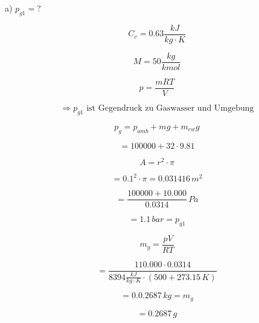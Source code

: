 a) $p_{g1} = ?$

\[
C_v = 0.63 \frac{kJ}{kg \cdot K}
\]

\[
M = 50 \frac{kg}{kmol}
\]

\[
p = \frac{mRT}{V}
\]

\[
\Rightarrow p_{g1} \text{ ist Gegendruck zu Gaswasser und Umgebung}
\]

\[
p_g = p_{amb} + mg + m_{ew} g
\]

\[
= 100000 + 32 \cdot 9.81
\]

\[
A = r^2 \cdot \pi
\]

\[
= 0.1^2 \cdot \pi = 0.031416 \, m^2
\]

\[
= \frac{100000 + 10.000}{0.0314} \, Pa
\]

\[
= 1.1 \, bar = p_{g1}
\]

\[
m_g = \frac{pV}{RT}
\]

\[
= \frac{110.000 \cdot 0.0314}{8394 \frac{kJ}{kg \cdot K} \cdot (500 + 273.15 \, K)}
\]

\[
= 0.0.2687 \, kg = m_g
\]

\[
= 0.2687 \, g
\]